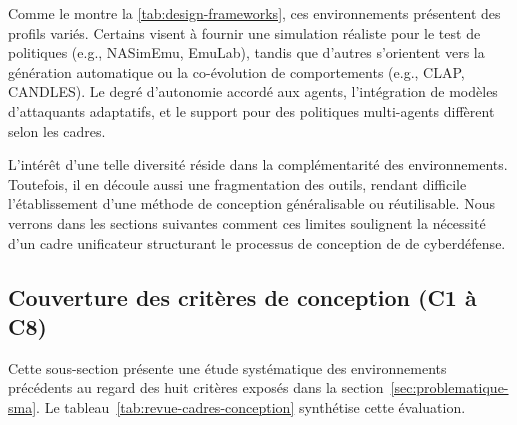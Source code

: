 \medskip

Comme le montre la \autoref{tab:design-frameworks}, ces environnements présentent des profils variés. Certains visent à fournir une simulation réaliste pour le test de politiques (e.g., NASimEmu, EmuLab), tandis que d’autres s’orientent vers la génération automatique ou la co-évolution de comportements (e.g., CLAP, CANDLES). Le degré d’autonomie accordé aux agents, l’intégration de modèles d’attaquants adaptatifs, et le support pour des politiques multi-agents diffèrent selon les cadres.

L’intérêt d’une telle diversité réside dans la complémentarité des environnements. Toutefois, il en découle aussi une fragmentation des outils, rendant difficile l’établissement d’une méthode de conception généralisable ou réutilisable. Nous verrons dans les sections suivantes comment ces limites soulignent la nécessité d’un cadre unificateur structurant le processus de conception de  de cyberdéfense.

\subsection{Couverture des critères de conception (C1 à C8)}

Cette sous-section présente une étude systématique des environnements précédents au regard des huit critères exposés dans la section~\ref{sec:problematique-sma}. Le tableau~\ref{tab:revue-cadres-conception} synthétise cette évaluation.

